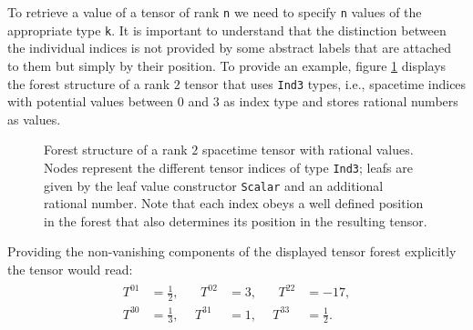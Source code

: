 To retrieve a value of a tensor of rank \texttt{n} we need to specify \texttt{n} values of the appropriate type \texttt{k}. It is important to understand that the distinction between the individual indices is not provided by some abstract labels that are attached to them but simply by their position. To provide an example, figure \ref{ExampleTens} displays the forest structure of a rank $2$ tensor that uses \texttt{Ind3} types, i.e., spacetime indices with potential values between $0$ and $3$ as index type and stores rational numbers as values.
\begin{figure}[hbt!]
\centering
{}
\caption[Forest Structure of a Rank $2$ Spacetime Tensor]{Forest structure of a rank $2$ spacetime tensor with rational values. Nodes represent the different tensor indices of type \texttt{Ind3}; leafs are given by the leaf value constructor \texttt{Scalar} and an additional rational number. Note that each index obeys a well defined position in the forest that also determines its position in the resulting tensor.}\label{ExampleTens}
\end{figure}
Providing the non-vanishing components of the displayed tensor forest explicitly the tensor would read:
\begin{align}
\begin{alignedat}{3}
T^{01} &= \frac{1}{2}, \ \  &  \ \ T^{02} &= 3, \ \  & \ \ T^{22} &= -17,\\
T^{30} &= \frac{1}{3}, & T^{31} &= 1, & T^{33} &= \frac{1}{2}.
\end{alignedat}
\end{align}

